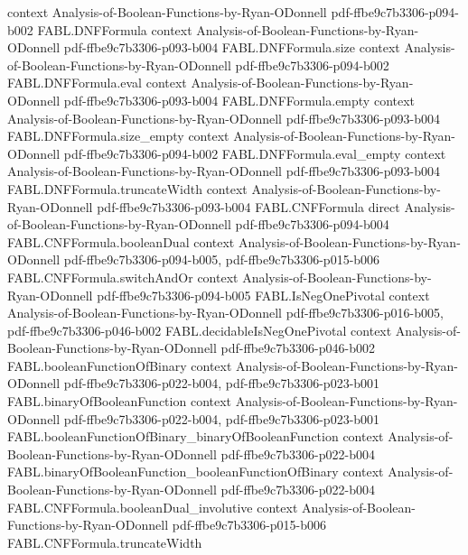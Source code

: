 \begin{theorem}
  {context}
  {Analysis-of-Boolean-Functions-by-Ryan-ODonnell}
  {pdf-ffbe9c7b3306-p094-b002}
\proofstep
  {FABL.DNFFormula}
  {context}
  {Analysis-of-Boolean-Functions-by-Ryan-ODonnell}
  {pdf-ffbe9c7b3306-p093-b004}
\proofstep
  {FABL.DNFFormula.size}
  {context}
  {Analysis-of-Boolean-Functions-by-Ryan-ODonnell}
  {pdf-ffbe9c7b3306-p094-b002}
\proofstep
  {FABL.DNFFormula.eval}
  {context}
  {Analysis-of-Boolean-Functions-by-Ryan-ODonnell}
  {pdf-ffbe9c7b3306-p093-b004}
\proofstep
  {FABL.DNFFormula.empty}
  {context}
  {Analysis-of-Boolean-Functions-by-Ryan-ODonnell}
  {pdf-ffbe9c7b3306-p093-b004}
\proofstep
  {FABL.DNFFormula.size_empty}
  {context}
  {Analysis-of-Boolean-Functions-by-Ryan-ODonnell}
  {pdf-ffbe9c7b3306-p094-b002}
\proofstep
  {FABL.DNFFormula.eval_empty}
  {context}
  {Analysis-of-Boolean-Functions-by-Ryan-ODonnell}
  {pdf-ffbe9c7b3306-p093-b004}
\proofstep
  {FABL.DNFFormula.truncateWidth}
  {context}
  {Analysis-of-Boolean-Functions-by-Ryan-ODonnell}
  {pdf-ffbe9c7b3306-p093-b004}
\proofstep
  {FABL.CNFFormula}
  {direct}
  {Analysis-of-Boolean-Functions-by-Ryan-ODonnell}
  {pdf-ffbe9c7b3306-p094-b004}
\proofstep
  {FABL.CNFFormula.booleanDual}
  {context}
  {Analysis-of-Boolean-Functions-by-Ryan-ODonnell}
  {pdf-ffbe9c7b3306-p094-b005,
    pdf-ffbe9c7b3306-p015-b006}
\proofstep
  {FABL.CNFFormula.switchAndOr}
  {context}
  {Analysis-of-Boolean-Functions-by-Ryan-ODonnell}
  {pdf-ffbe9c7b3306-p094-b005}
\proofstep
  {FABL.IsNegOnePivotal}
  {context}
  {Analysis-of-Boolean-Functions-by-Ryan-ODonnell}
  {pdf-ffbe9c7b3306-p016-b005,
    pdf-ffbe9c7b3306-p046-b002}
\proofstep
  {FABL.decidableIsNegOnePivotal}
  {context}
  {Analysis-of-Boolean-Functions-by-Ryan-ODonnell}
  {pdf-ffbe9c7b3306-p046-b002}
\proofstep
  {FABL.booleanFunctionOfBinary}
  {context}
  {Analysis-of-Boolean-Functions-by-Ryan-ODonnell}
  {pdf-ffbe9c7b3306-p022-b004,
    pdf-ffbe9c7b3306-p023-b001}
\proofstep
  {FABL.binaryOfBooleanFunction}
  {context}
  {Analysis-of-Boolean-Functions-by-Ryan-ODonnell}
  {pdf-ffbe9c7b3306-p022-b004,
    pdf-ffbe9c7b3306-p023-b001}
\proofstep
  {FABL.booleanFunctionOfBinary_binaryOfBooleanFunction}
  {context}
  {Analysis-of-Boolean-Functions-by-Ryan-ODonnell}
  {pdf-ffbe9c7b3306-p022-b004}
\proofstep
  {FABL.binaryOfBooleanFunction_booleanFunctionOfBinary}
  {context}
  {Analysis-of-Boolean-Functions-by-Ryan-ODonnell}
  {pdf-ffbe9c7b3306-p022-b004}
\proofstep
  {FABL.CNFFormula.booleanDual_involutive}
  {context}
  {Analysis-of-Boolean-Functions-by-Ryan-ODonnell}
  {pdf-ffbe9c7b3306-p015-b006}
\proofstep
  {FABL.CNFFormula.truncateWidth}

\end{theorem}
